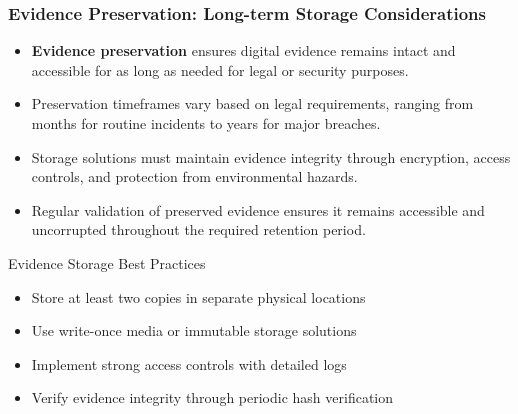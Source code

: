 \documentclass{beamer}
\begin{document}
\begin{frame}
\frametitle{Evidence Preservation: Long-term Storage Considerations}
\begin{itemize}
\item \textbf{Evidence preservation} ensures digital evidence remains intact and accessible for as long as needed for legal or security purposes.
\item Preservation timeframes vary based on legal requirements, ranging from months for routine incidents to years for major breaches.
\item Storage solutions must maintain evidence integrity through encryption, access controls, and protection from environmental hazards.
\item Regular validation of preserved evidence ensures it remains accessible and uncorrupted throughout the required retention period.
\end{itemize}

\begin{exampleblock}{Evidence Storage Best Practices}

\scriptsize
\begin{itemize}
\item Store at least two copies in separate physical locations
\item Use write-once media or immutable storage solutions
\item Implement strong access controls with detailed logs
\item Verify evidence integrity through periodic hash verification
\end{itemize}
\end{exampleblock}
\end{frame}
\end{document}
